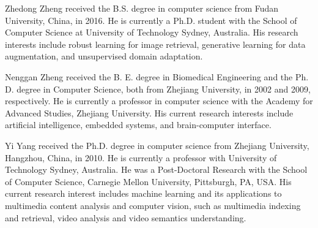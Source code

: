 \documentclass[journal]{IEEEtran}
\begin{document}
{\footnotesize


}

\begin{IEEEbiography}{Zhedong Zheng}
received the B.S. degree in computer science from Fudan University, China, in 2016. He is currently a Ph.D. student with the School of Computer Science at University of Technology Sydney, Australia. His research interests include robust learning for image retrieval, generative learning for data augmentation, and unsupervised domain adaptation.
\end{IEEEbiography}
\vfill
\begin{IEEEbiography}{Nenggan Zheng}
received the B. E. degree in Biomedical Engineering and the Ph. D. degree in Computer Science, both from Zhejiang University, in 2002 and 2009, respectively. He is currently a professor in computer science with the Academy for Advanced Studies, Zhejiang University. His current research interests include artificial intelligence, embedded systems, and brain-computer interface.
\end{IEEEbiography}
\vfill
\begin{IEEEbiography}{Yi Yang} received the Ph.D. degree in computer
science from Zhejiang University, Hangzhou, China, in 2010. He is currently a professor with University of Technology Sydney, Australia.
He was a Post-Doctoral Research with the School of Computer Science, Carnegie Mellon University, Pittsburgh, PA, USA. His current research interest includes machine learning and its applications to multimedia content analysis and computer vision, such as multimedia indexing and retrieval, video analysis and video semantics understanding.
\end{IEEEbiography}
\end{document}
